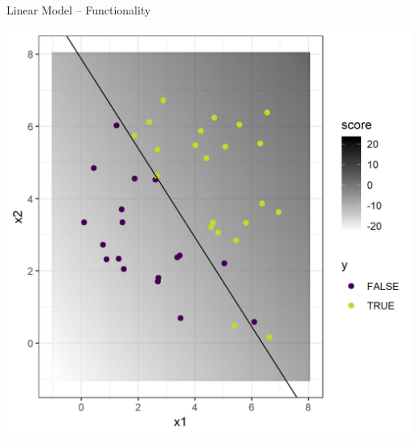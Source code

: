 \documentclass[11pt,compress,t,notes=noshow, xcolor=table]{beamer}
\begin{document}
\begin{frame}{Linear Model -- Functionality}
\begin{minipage}{0.22\textwidth}
  \includegraphics[width=1.2\textwidth]{figure/logreg-2vars-data.png}
\end{minipage}

\end{frame}

\end{document}
